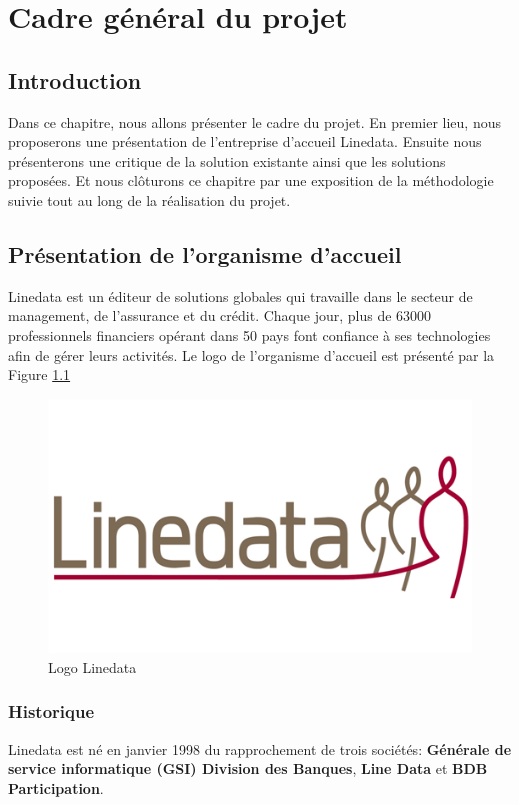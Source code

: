 \chapter{Cadre général du projet}
\section{Introduction}
Dans ce chapitre, nous allons présenter le cadre du projet. En premier lieu, nous proposerons une présentation de l'entreprise d'accueil Linedata. Ensuite nous présenterons une critique de la solution existante ainsi que les solutions proposées. Et nous clôturons ce chapitre par une exposition de la méthodologie suivie tout au long de la réalisation du projet.
\section{Présentation de l'organisme d'accueil}
Linedata est un éditeur de solutions globales qui travaille dans le secteur de management, de l'assurance et du crédit. Chaque jour, plus de 63000 professionnels financiers opérant dans 50 pays font confiance à ses technologies afin de gérer leurs activités. Le logo de l'organisme d'accueil est présenté par la Figure \ref{code1}
\begin{figure}[h]
  \centering
  \includegraphics[scale=0.3]{figures/linedatalogo.png}
  \caption{Logo Linedata}
  \label{code1}
\end{figure}

\subsection{Historique}
Linedata est né en janvier 1998 du rapprochement de trois sociétés: \textbf{Générale de service informatique (GSI) Division des Banques}, \textbf{Line Data} et \textbf{BDB Participation}.\\

